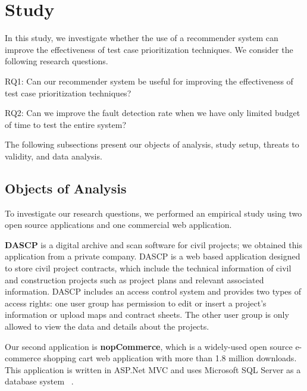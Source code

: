 \vspace*{4pt}
\section{Study}
\label{sec:study}

In this study, we investigate whether the use of a recommender system 
can improve the effectiveness of test case prioritization techniques.
We consider the following research questions.

\begin{smallitem}
\item[RQ1:] Can our recommender system be useful for 
improving the effectiveness of test case prioritization techniques?

\item[RQ2:] Can we improve the fault detection rate when we have
only limited budget of time to test the entire system? 
\end{smallitem}

The following subsections present our objects of analysis, 
study setup, threats to validity, and data analysis.

\vspace*{4pt}
\subsection{Objects of Analysis}
\label{sec:objects}

To investigate our research questions, we performed an empirical study 
using two open source applications and one commercial web application.

\textbf{DASCP} is a digital archive and scan software for civil projects; 
 we obtained this application from a private company.  
DASCP is a web based application designed to store civil project 
contracts, which include the technical information of civil and construction projects 
such as project plans and relevant associated information. 
DASCP includes an access control system and provides two types of access rights: 
one user group has permission to edit or insert a project's information or 
upload maps and contract sheets. The other user group is only allowed to view 
the data and details about the projects.

Our second application is \textbf{nopCommerce}, which is a widely-used open 
source e-commerce shopping cart web application with more than 1.8 million 
downloads. This application is written in ASP.Net MVC and uses 
Microsoft SQL Server as a database system ~\cite{nopCommerece}. 

